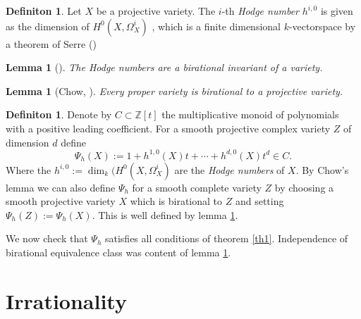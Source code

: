 \documentclass[11pt, a4paper, german]{article}
\theoremstyle{plain}
\newtheorem{lemma}[theorem]{Lemma}
\theoremstyle{definition}
\newtheorem{definition}[theorem]{Definiton}
\begin{document}
\begin{definition}
    Let $X$ be a projective variety. The $i$-th \emph{Hodge number} $h^{i,0}$ is given as the dimension of $H^0(X,\Omega^i_X)$
    , which is a finite dimensional $k$-vectorspace by a theorem of Serre (\cite[§3 Prop. 7]{FAC})
\end{definition}

\begin{lemma}[{\cite[II Ex. 8.8]{Ha}}]
    \label{bir}
    The Hodge numbers are a birational invariant of a variety.
\end{lemma}

\begin{lemma}[Chow, {\cite[II Ex. 4.10]{Ha}}]
    Every proper variety is birational to a projective variety.
\end{lemma}

\begin{definition}
    Denote by $C \subset \mathbb{Z}[t]$ the multiplicative monoid of polynomials with a positive leading coefficient.
    For a smooth projective complex variety $Z$ of dimension $d$ define
    \[
        \Psi_h(X) := 1 + h^{1,0}(X)t + \cdots + h^{d,0}(X)t^d \in C.
    \]
    Where the $h^{i,0} := \dim_k(H^0(X, \Omega^i_X)$ are the \emph{Hodge numbers} of $X$.
    By Chow's lemma we can also define $\Psi_h$ for a smooth complete variety $Z$ by choosing a smooth projective variety $X$ which is birational
    to $Z$ and setting $\Psi_h(Z) := \Psi_h(X)$. This is well defined by lemma \ref{bir}.
\end{definition}

We now check that $\Psi_h$ satisfies all conditions of theorem \ref{th1}. Independence of birational equivalence class was content of lemma
\ref{bir}. 

\section{Irrationality}

{}

\end{document}
